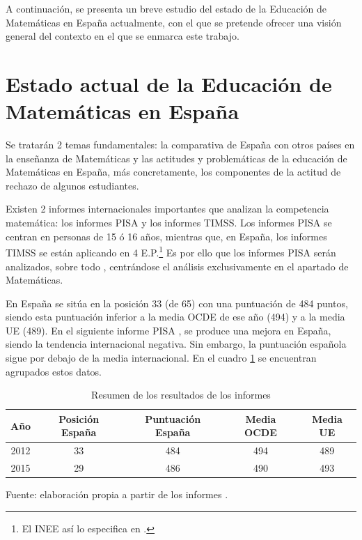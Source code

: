 

\label{chap:intro} %

A continuación, se presenta un breve estudio del estado de la Educación de Matemáticas en España actualmente, con el que se pretende ofrecer una visión general del contexto en el que se enmarca este trabajo.


\section{Estado actual de la Educación de Matemáticas en España}
\label{sec:EstadoEducacionMates}

Se tratarán 2 temas fundamentales: la comparativa de España con otros países en la enseñanza de Matemáticas y las actitudes y problemáticas de la educación de Matemáticas en España, más concretamente, los componentes de la actitud de rechazo de algunos estudiantes.



Existen 2 informes internacionales importantes que analizan la competencia matemática: los informes \gls{PISA} y los informes \gls{TIMSS}. 
%
%
Los informes \gls{PISA} se centran en personas de 15 ó 16 años, mientras que, en España, los informes \gls{TIMSS} se están aplicando en 4 E.P.\footnote{El \gls{INEE} así lo especifica en \cite{InformeTimss}.} 
%
Es por ello que los informes \gls{PISA} serán analizados, sobre todo , centrándose el análisis exclusivamente en el apartado de Matemáticas.

En  España se sitúa en la posición 33 (de 65) con una puntuación de 484 puntos, siendo esta puntuación inferior a la media OCDE de ese año (494) y a la media UE (489).
%
En el siguiente informe PISA , se produce una mejora en España, siendo la tendencia internacional negativa. 
%
Sin embargo, la puntuación española sigue por debajo de la media internacional.
%
En el cuadro \ref{tbl::ResumenPisa} se encuentran agrupados estos datos.

\begin{table}[hbtp]
\centering
\caption{Resumen de los resultados de los informes }
\label{tbl::ResumenPisa}
\begin{tabular}{c|cccc}
Año & Posición España & Puntuación España & Media OCDE & Media UE\\\hline
2012 & 33 & 484 & 494 & 489\\
2015 & 29 & 486 & 490 & 493
\end{tabular}
\vspace{0.3cm}

\small{Fuente: elaboración propia a partir de los informes .}
\end{table}

